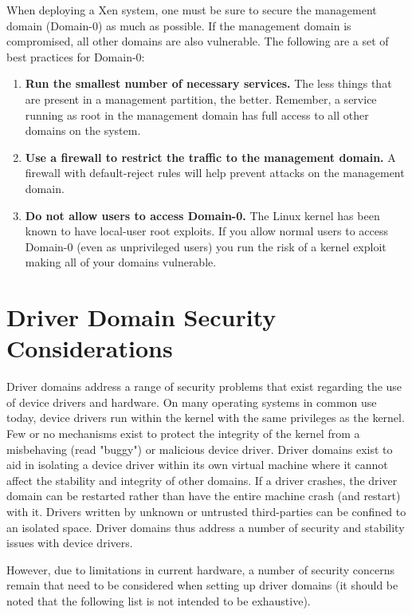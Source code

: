 \documentclass[11pt,twoside,final,openright]{report}
\begin{document}
When deploying a Xen system, one must be sure to secure the management
domain (Domain-0) as much as possible. If the management domain is
compromised, all other domains are also vulnerable. The following are a
set of best practices for Domain-0:

\begin{enumerate}
\item \textbf{Run the smallest number of necessary services.} The less
  things that are present in a management partition, the better.
  Remember, a service running as root in the management domain has full
  access to all other domains on the system.
\item \textbf{Use a firewall to restrict the traffic to the management
    domain.} A firewall with default-reject rules will help prevent
  attacks on the management domain.
\item \textbf{Do not allow users to access Domain-0.} The Linux kernel
  has been known to have local-user root exploits. If you allow normal
  users to access Domain-0 (even as unprivileged users) you run the risk
  of a kernel exploit making all of your domains vulnerable.
\end{enumerate}

\section{Driver Domain Security Considerations}
\label{s:ddsecurity}

Driver domains address a range of security problems that exist regarding
the use of device drivers and hardware. On many operating systems in common
use today, device drivers run within the kernel with the same privileges as
the kernel. Few or no mechanisms exist to protect the integrity of the kernel
from a misbehaving (read "buggy") or malicious device driver. Driver
domains exist to aid in isolating a device driver within its own virtual
machine where it cannot affect the stability and integrity of other
domains. If a driver crashes, the driver domain can be restarted rather than
have the entire machine crash (and restart) with it. Drivers written by
unknown or untrusted third-parties can be confined to an isolated space.
Driver domains thus address a number of security and stability issues with
device drivers.

However, due to limitations in current hardware, a number of security
concerns remain that need to be considered when setting up driver domains (it
should be noted that the following list is not intended to be exhaustive).
\end{document}
